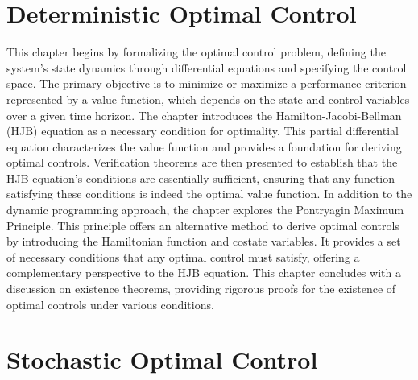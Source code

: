 \documentclass[12pt,a4paper,oneside]{book}
\numberwithin{theorem}{section}
\numberwithin{definition}{section}
\numberwithin{example}{section}
\numberwithin{exercise}{section}
\begin{document}
\hypersetup{colorlinks, linkcolor = gray, citecolor = gray, hidelinks}


\chapter{Deterministic Optimal Control}

This chapter begins by formalizing the optimal control problem, defining the system's state dynamics through differential equations and specifying the control space. The primary objective is to minimize or maximize a performance criterion represented by a value function, which depends on the state and control variables over a given time horizon. The chapter introduces the Hamilton-Jacobi-Bellman (HJB) equation as a necessary condition for optimality. This partial differential equation characterizes the value function and provides a foundation for deriving optimal controls. Verification theorems are then presented to establish that the HJB equation's conditions are essentially sufficient, ensuring that any function satisfying these conditions is indeed the optimal value function. In addition to the dynamic programming approach, the chapter explores the Pontryagin Maximum Principle. This principle offers an alternative method to derive optimal controls by introducing the Hamiltonian function and costate variables. It provides a set of necessary conditions that any optimal control must satisfy, offering a complementary perspective to the HJB equation. This chapter concludes with a discussion on existence theorems, providing rigorous proofs for the existence of optimal controls under various conditions.











\clearpage

\chapter{Stochastic Optimal Control}
\end{document}
